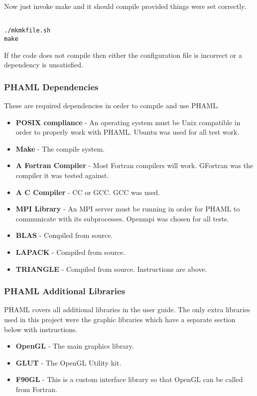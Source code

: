 Now just invoke make and it should compile provided things were set correctly.

\begin{framecode}{6in}
\begin{verbatim}

./mkmkfile.sh
make

\end{verbatim}
\end{framecode}

If the code does not compile then either the configuration file is incorrect or a dependency is unsatisfied.


\subsubsection{PHAML Dependencies}
These are required dependencies in order to compile and use PHAML.  
\begin{itemize}
    \item \textbf{POSIX compliance} - An operating system must be Unix compatible in order to properly work with PHAML.  Ubuntu was used for all test work.
    \item \textbf{Make} - The compile system. 
    \item \textbf{A Fortran Compiler} - Most Fortran compilers will work.  GFortran was the compiler it was tested against.
    \item \textbf{A C Compiler} - CC or GCC.  GCC was used.
    \item \textbf{MPI Library} - An MPI server must be running in order for PHAML to communicate with its subprocesses.  Openmpi was chosen for all tests.
    \item \textbf{BLAS} - Compiled from source.
    \item \textbf{LAPACK} - Compiled from source.
    \item \textbf{TRIANGLE} - Compiled from source.  Instructions are above.
\end{itemize}
 

\subsubsection{PHAML Additional Libraries}
PHAML covers all additional libraries in the user guide.  The only extra libraries used in this project were the graphic libraries which have a separate section below with instructions.
\begin{itemize}
    \item \textbf{OpenGL} - The main graphics library.
    \item \textbf{GLUT} - The OpenGL Utility kit.
    \item \textbf{F90GL} - This is a custom interface library so that OpenGL can be called from Fortran.
\end{itemize}

